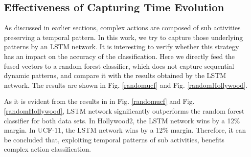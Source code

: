 \subsection{Effectiveness of Capturing Time Evolution}
As discussed in earlier sections, complex actions are composed of sub activities preserving
a temporal pattern. In this work, we try to capture those underlying patterns by an LSTM network.
It is interesting to verify whether this strategy has an impact on the accuracy of the
classification. Here we directly feed the fused vectors to a random forest classifier, which
does not capture sequential dynamic patterns, and compare it with the results obtained by
the LSTM network. The results are shown in Fig. \ref{randomucf} and Fig. \ref{randomHollywood}.


As it is evident from the results in in Fig. \ref{randomucf} and Fig. \ref{randomHollywood}, LSTM network significantly outperforms the
random forest classifier for both data sets. In Hollywood2, the LSTM network wins by a 12\% margin. In UCF-11, the LSTM network wins by a 12\% margin.
Therefore, it can be concluded that, exploiting
temporal patterns of sub activities, benefits complex action classification.



\mydata

